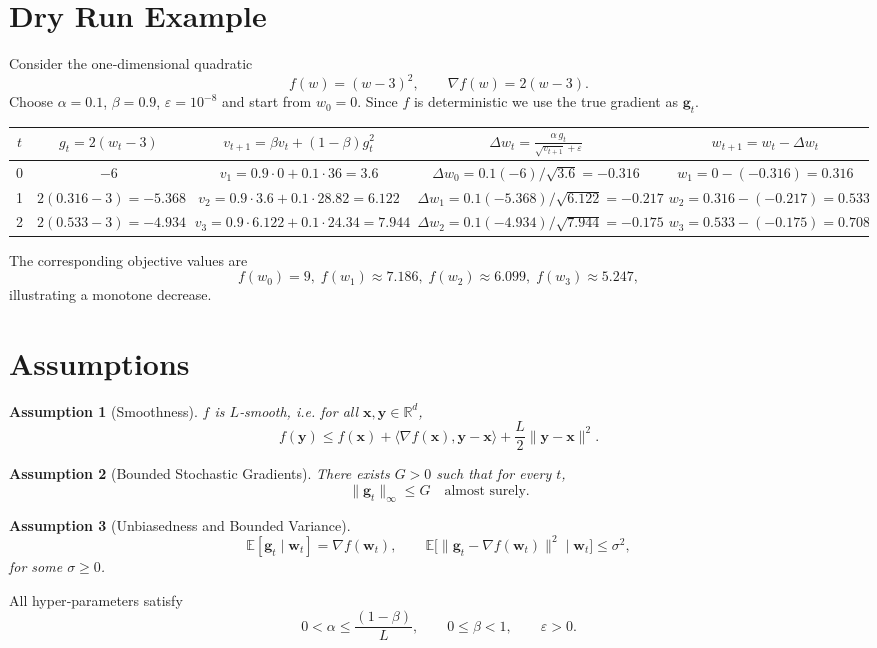 \documentclass{article}
\newtheorem{assumption}{Assumption}
\newcommand{\E}{\mathbb{E}}
\newcommand{\R}{\mathbb{R}}
\begin{document}
\section*{Dry Run Example}
Consider the one‑dimensional quadratic
\[
f(w)=(w-3)^{2},\qquad \nabla f(w)=2(w-3).
\]
Choose $\alpha=0.1$, $\beta=0.9$, $\varepsilon=10^{-8}$ and start from $w_{0}=0$.
Since $f$ is deterministic we use the true gradient as $\bm g_{t}$.

\begin{center}
\begin{tabular}{c|c|c|c|c}
$t$ & $g_{t}=2(w_{t}-3)$ & $v_{t+1}= \beta v_{t}+ (1-\beta)g_{t}^{2}$ & $\displaystyle \Delta w_{t}= \frac{\alpha\,g_{t}}{\sqrt{v_{t+1}}+\varepsilon}$ & $w_{t+1}=w_{t}-\Delta w_{t}$\\\hline
0 & $-6$ & $v_{1}=0.9\cdot0+0.1\cdot36=3.6$ & $\Delta w_{0}=0.1(-6)/\sqrt{3.6}= -0.316$ & $w_{1}=0-(-0.316)=0.316$\\
1 & $2(0.316-3)=-5.368$ & $v_{2}=0.9\cdot3.6+0.1\cdot28.82=6.122$ & $\Delta w_{1}=0.1(-5.368)/\sqrt{6.122}= -0.217$ & $w_{2}=0.316-(-0.217)=0.533$\\
2 & $2(0.533-3)=-4.934$ & $v_{3}=0.9\cdot6.122+0.1\cdot24.34=7.944$ & $\Delta w_{2}=0.1(-4.934)/\sqrt{7.944}= -0.175$ & $w_{3}=0.533-(-0.175)=0.708$
\end{tabular}
\end{center}
The corresponding objective values are
\[
f(w_{0})=9,\; f(w_{1})\approx7.186,\; f(w_{2})\approx6.099,\; f(w_{3})\approx5.247,
\]
illustrating a monotone decrease.

\section*{Assumptions}
\begin{assumption}[Smoothness]\label{as:smooth}
$f$ is $L$‑smooth, i.e. for all $\bm x,\bm y\in\R^{d}$,
\[
f(\bm y)\le f(\bm x)+\langle\nabla f(\bm x),\bm y-\bm x\rangle+\frac{L}{2}\|\bm y-\bm x\|^{2}.
\tag{A1}
\]
\end{assumption}
\begin{assumption}[Bounded Stochastic Gradients]\label{as:bounded}
There exists $G>0$ such that for every $t$,
\[
\|\bm g_{t}\|_{\infty}\le G\quad\text{almost surely.}
\tag{A2}
\]
\end{assumption}
\begin{assumption}[Unbiasedness and Bounded Variance]\label{as:unbiased}
\[
\E[\bm g_{t}\mid \bm w_{t}]=\nabla f(\bm w_{t}),\qquad
\E\big[\|\bm g_{t}-\nabla f(\bm w_{t})\|^{2}\mid \bm w_{t}\big]\le\sigma^{2},
\tag{A3}
\]
for some $\sigma\ge0$.
\end{assumption}
All hyper‑parameters satisfy
\[
0<\alpha\le\frac{(1-\beta)}{L},\qquad 0\le\beta<1,\qquad \varepsilon>0.
\tag{A4}
\]
\end{document}
